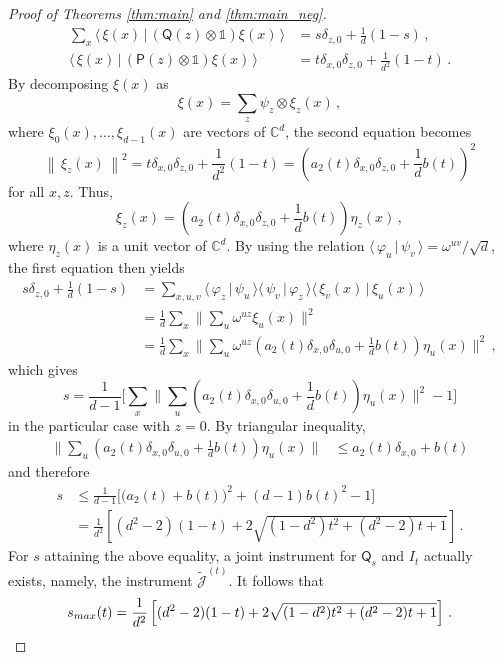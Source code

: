 \documentclass[10pt,a4paper]{amsart}
\newcommand{\Cb}{\mathbb{C}} %
\newcommand{\Po}{\mathsf{P}}%
\newcommand{\Qo}{\mathsf{Q}}%
\newcommand{\id}{\mathds{1}} %
\newcommand{\ii}{\mathcal{J}}
\newcommand{\ip}[2]{\langle\,#1\,\vert\,#2\,\rangle} %
\newcommand{\no}[1]{\left\|\,#1\,\right\|} %
\newcommand{\phii}{\varphi} %
\begin{document}
\begin{proof}[Proof of Theorems \ref{thm:main} and \ref{thm:main_neg}]
\begin{equation*}
\begin{aligned}
\sum_x \ip{\xi(x)}{(\Qo(z)\otimes\id)\xi(x)} & = s\delta_{z,0} + \frac{1}{d}(1-s) \,,\\
\ip{\xi(x)}{(\Po(z)\otimes\id)\xi(x)} & = t\delta_{x,0}\delta_{z,0} + \frac{1}{d^2}(1-t)\,.
\end{aligned}
\end{equation*}
By decomposing $\xi(x)$ as
$$
\xi(x) = \sum_z \psi_z\otimes\xi_z(x)\,,
$$
where $\xi_0(x),\ldots,\xi_{d-1}(x)$ are vectors of $\Cb^d$, the second equation becomes
$$
\no{\xi_z(x)}^2 = t\delta_{x,0}\delta_{z,0} + \frac{1}{d^2}(1-t) = \left(a_2(t)\delta_{x,0}\delta_{z,0} + \frac{1}{d} b(t)\right)^2
$$
for all $x,z$. Thus,
$$
\xi_z(x) = \left(a_2(t)\delta_{x,0}\delta_{z,0} + \frac{1}{d} b(t)\right) \eta_z(x)\,,
$$
where $\eta_z(x)$ is a unit vector of $\Cb^d$. By using the relation $\ip{\phii_u}{\psi_v} = \omega^{uv}/\sqrt{d}$, the first equation then yields
\begin{align*}
s\delta_{z,0} + \frac{1}{d}(1-s) & = \sum_{x,u,v} \ip{\phii_z}{\psi_u} \ip{\psi_v}{\phii_z} \ip{\xi_v(x)}{\xi_u(x)} \\
& = \frac{1}{d} \sum_x \bigg\|\sum_u \omega^{uz} \xi_u(x)\bigg\|^2 \\
& = \frac{1}{d} \sum_x \bigg\|\sum_u \omega^{uz} \left(a_2(t)\delta_{x,0}\delta_{u,0} + \frac{1}{d} b(t)\right) \eta_u(x)\bigg\|^2\,,
\end{align*}
which gives
$$
s = \frac{1}{d-1} \bigg[ \sum_x \bigg\|\sum_u \left(a_2(t)\delta_{x,0}\delta_{u,0} + \frac{1}{d} b(t)\right) \eta_u(x)\bigg\|^2 - 1 \bigg]
$$
in the particular case with $z=0$. By triangular inequality,
\begin{align*}
\bigg\|\sum_u \left(a_2(t)\delta_{x,0}\delta_{u,0} + \frac{1}{d} b(t)\right) \eta_u(x)\bigg\| & \leq a_2(t)\delta_{x,0} + b(t)
\end{align*}
and therefore
\begin{align*}
s & \leq \frac{1}{d-1} \big[ \big(a_2(t) + b(t)\big)^2 + (d-1)b(t)^2 - 1 \big] \\
& = \frac{1}{d^2}\left[(d^2 - 2) (1 - t) + 2\sqrt{(1 - d^2) t^2 + (d^2 - 2) t + 1}\right]\,.
\end{align*}
For $s$ attaining the above equality, a joint instrument for $\Qo_s$ and $I_t$ actually exists, namely, the instrument $\tilde{\ii}^{(t)}$. It follows that
$$
s_{\rm max}(t) = \frac{1}{d^2}\left[(d^2 - 2) (1 - t) + 2\sqrt{(1 - d^2) t^2 + (d^2 - 2) t + 1}\right]\,.
$$
\end{proof}
\end{document}
